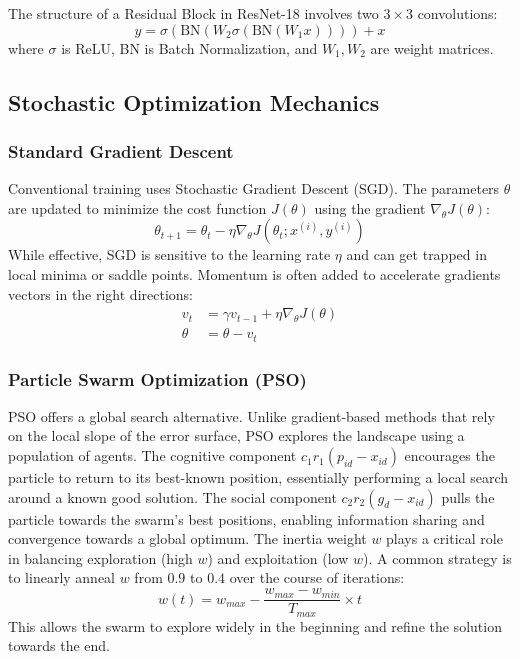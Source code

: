 \documentclass[11pt, a4paper]{article}
\begin{document}
The structure of a Residual Block in ResNet-18 involves two $3 \times 3$ convolutions:
\begin{equation}
y = \sigma(\text{BN}(W_2 \sigma(\text{BN}(W_1 x)))) + x
\end{equation}
where $\sigma$ is ReLU, BN is Batch Normalization, and $W_1, W_2$ are weight matrices.

\subsection{Stochastic Optimization Mechanics}
\subsubsection{Standard Gradient Descent}
Conventional training uses Stochastic Gradient Descent (SGD). The parameters $\theta$ are updated to minimize the cost function $J(\theta)$ using the gradient $\nabla_\theta J(\theta)$:
\begin{equation}
\theta_{t+1} = \theta_t - \eta \nabla_\theta J(\theta_t; x^{(i)}, y^{(i)})
\end{equation}
While effective, SGD is sensitive to the learning rate $\eta$ and can get trapped in local minima or saddle points. Momentum is often added to accelerate gradients vectors in the right directions:
\begin{align}
v_t &= \gamma v_{t-1} + \eta \nabla_\theta J(\theta) \\
\theta &= \theta - v_t
\end{align}

\subsubsection{Particle Swarm Optimization (PSO)}
PSO offers a global search alternative. Unlike gradient-based methods that rely on the local slope of the error surface, PSO explores the landscape using a population of agents.
The cognitive component $c_1 r_1 (p_{id} - x_{id})$ encourages the particle to return to its best-known position, essentially performing a local search around a known good solution.
The social component $c_2 r_2 (g_{d} - x_{id})$ pulls the particle towards the swarm's best positions, enabling information sharing and convergence towards a global optimum.
The inertia weight $w$ plays a critical role in balancing exploration (high $w$) and exploitation (low $w$). A common strategy is to linearly anneal $w$ from $0.9$ to $0.4$ over the course of iterations:
\begin{equation}
w(t) = w_{max} - \frac{w_{max} - w_{min}}{T_{max}} \times t
\end{equation}
This allows the swarm to explore widely in the beginning and refine the solution towards the end.
\end{document}
